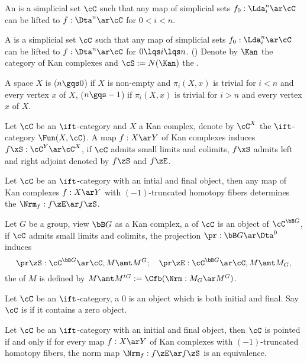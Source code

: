 \documentclass[article, a4paper, twoside]{universal}
\begin{document}
\begin{dfn}[0.0.0.1, Page~12]
    An  is a simplicial set $\cC$ such that any map of simplicial sets $f_{0}:\Lda_{i}^{n}\ar\cC$ can be lifted to $f:\Dta^{n}\ar\cC$ for $0<i<n$.

    A  is a simplicial set $\cC$ such that any map of simplicial sets $f_{0}:\Lda_{i}^{n}\ar\cC$ can be lifted to $f:\Dta^{n}\ar\cC$ for $0\lqs i\lqs n$. (\cite[1.2.16.1]{Lurie2009}) Denote by $\Kan$ the category of Kan complexes and $\cS:=N(\Kan)$ the .

    A space $X$ is  ($n\gqs0$) if $X$ is non-empty and $\pi_{i}(X,x)$ is trivial for $i<n$ and every vertex $x$ of $X$,  ($n\gqs-1$) if $\pi_{i}(X,x)$ is trivial for $i>n$ and every vertex $x$ of $X$.
\end{dfn}

\begin{dfn}[6.1.6.1, 6.1.6.4]
    Let $\cC$ be an $\ift$-category and $X$ a Kan complex, denote by $\cC^{X}$ the $\ift$-category $\Fun(X,\cC)$. A map $f:X\ar Y$ of Kan complexes induces $f\xS:\cC^{Y}\ar\cC^{X}$, if $\cC$ admits small limits and colimits, $f\xS$ admits left and right adjoint denoted by $f\zS$ and $f\zE$.

    Let $\cC$ be an $\ift$-category with an intial and final object, then any map of Kan complexes $f:X\ar Y$ with $(-1)$-truncated homotopy fibers determines the  $\Nrm_{f}:f\zE\ar f\zS$.
\end{dfn}

\begin{dfn}[6.1.6.2, 6.1.6.24]
    Let $G$ be a group, view $\bB G$ as a Kan complex, a  of $\cC$ is an object of $\cC^{\bB G}$, if $\cC$ admits small limits and colimits, the projection $\pr:\bB G\ar\Dta^{0}$ induces
    \[
        \pr\zS:\cC^{\bB G}\ar\cC, M\amt M^{G};\quad \pr\zE:\cC^{\bB G}\ar\cC, M\amt M_{G},
    \]
    the  of $M$ is defined by $M\amt M^{tG}:=\Cfb(\Nrm:M_{G}\ar M^{G})$.
\end{dfn}

\begin{dfn}[1.1.1.1]
    Let $\cC$ be an $\ift$-category, a  $0$ is an object which is both initial and final. Say $\cC$ is  if it contains a zero object.
\end{dfn}

\begin{thm}[6.1.6.7]
    Let $\cC$ be an $\ift$-category with an initial and final object, then $\cC$ is pointed if and only if for every map $f:X\ar Y$ of Kan complexes with $(-1)$-truncated homotopy fibers, the norm map $\Nrm_{f}:f\zE\ar f\zS$ is an equivalence.
\end{thm}
\end{document}
